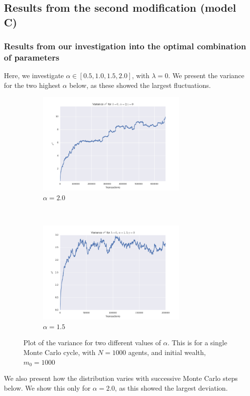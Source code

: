 \documentclass[a4paper, 10pt]{article}
\begin{document}
\subsection{Results from the second modification (model C)}
\subsubsection{Results from our investigation into the optimal combination of parameters}
Here, we investigate $\alpha \in [0.5, 1.0, 1.5, 2.0]$, with $\lambda=0$. We present the variance for the two highest $\alpha$ below, as these showed the largest fluctuations.
\begin{figure}[!ht] %
    \centering
    \begin{subfigure}[H!]{0.5\textwidth}
        \centering
        \includegraphics[height=2.0in]{varL0A2G0.png}
        \caption{$\alpha=2.0$}\label{fig:ModelC_Var_alpha_2}
    \end{subfigure}%
    ~ 
    \begin{subfigure}[H!]{0.5\textwidth}
        \centering
        \includegraphics[height=2.0in]{varL0A15G0.png}
        \caption{$\alpha=1.5$}\label{fig:ModelC_Var_alpha_15}
    \end{subfigure}
    \caption{Plot of the variance for two different values of $\alpha$. This is for a single Monte Carlo cycle, with $N=1000$ agents, and initial wealth, $m_0=1000$}\label{fig:ModelC_variance}
\end{figure}
We also present how the distribution varies with successive Monte Carlo steps below. We show this only for $\alpha=2.0$, as this showed the largest deviation.
\end{document}
